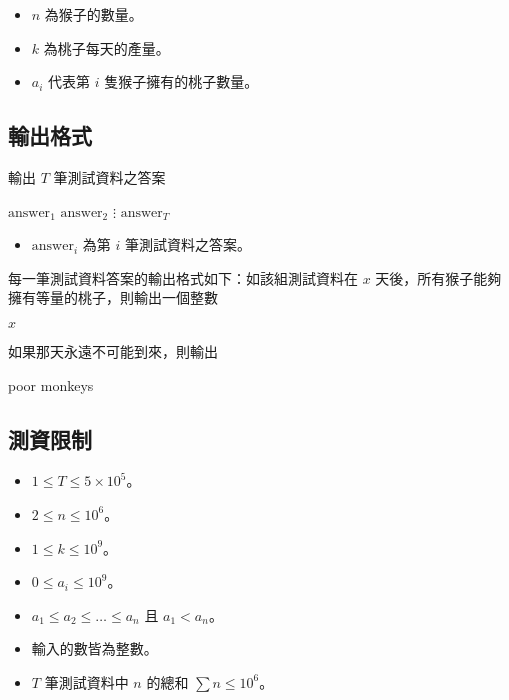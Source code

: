 \begin{itemize}
\tightlist
\item
  \(n\) 為猴子的數量。
\item
  \(k\) 為桃子每天的產量。
\item
  \(a_i\) 代表第 \(i\) 隻猴子擁有的桃子數量。
\end{itemize}

\subsection{輸出格式}

輸出 \(T\) 筆測試資料之答案

\begin{format}
\f{
$\text{answer}_1$
$\text{answer}_2$
$\vdots$
$\text{answer}_T$
}
\end{format}

\begin{itemize}
\tightlist
\item
  \(\text{answer}_i\) 為第 \(i\) 筆測試資料之答案。
\end{itemize}

每一筆測試資料答案的輸出格式如下：如該組測試資料在 \(x\)
天後，所有猴子能夠擁有等量的桃子，則輸出一個整數

\begin{format}
\f{
$x$
}
\end{format}

如果那天永遠不可能到來，則輸出

\begin{format}
\f{
poor monkeys
}
\end{format}

\subsection{測資限制}

\begin{itemize}
\tightlist
\item
  \(1 \leq T \leq 5 \times 10^5\)。
\item
  \(2 \leq n \leq 10^6\)。
\item
  \(1 \leq k \leq 10^9\)。
\item
  \(0 \leq a_i \leq 10^9\)。
\item
  \(a_1 \leq a_2 \leq \dots \leq a_n\) 且 \(a_1 < a_n\)。
\item
  輸入的數皆為整數。
\item
  \(T\) 筆測試資料中 \(n\) 的總和 \(\sum n \leq 10^6\)。
\end{itemize}

